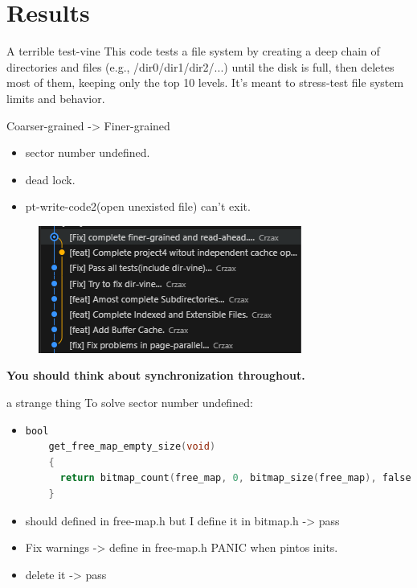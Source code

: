 \documentclass[10pt]{beamer}
\begin{document}
\section{Results}
\begin{frame}[fragile]{A terrible test-vine}
    This code tests a file system by creating a deep chain of directories and files (e.g., /dir0/dir1/dir2/...) until the disk is full, then deletes most of them, keeping only the top 10 levels. It’s meant to stress-test file system limits and behavior.

    Coarser-grained -> Finer-grained
\begin{itemize}
    \item sector number undefined.
    \item dead lock.
    \item pt-write-code2(open unexisted file) can't exit.
\end{itemize}
    \begin{figure}
        \centering
        \includegraphics[width=0.5\linewidth]{figures/path.png}
    \end{figure}
    \textbf{You should think about synchronization throughout.}
\end{frame}
\begin{frame}[fragile]{a strange thing}
    To solve sector number undefined:
\begin{itemize}
    \item \begin{lstlisting}[language=C]
    bool 
    get_free_map_empty_size(void)
    {
      return bitmap_count(free_map, 0, bitmap_size(free_map), false);
    }
    \end{lstlisting}
    \item should defined in free-map.h but I define it in bitmap.h -> pass

    \item Fix warnings -> define in free-map.h
    PANIC when pintos inits.

    \item delete it -> pass 
\end{itemize}
\end{frame}
\end{document}

